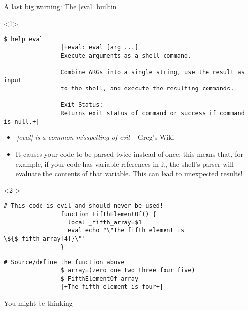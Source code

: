 \begin{frame}[fragile]{A last big warning: The \bash|eval| builtin}
    \begin{overlayarea}{\textwidth}{0.6\textheight}
        \begin{onlyenv}<1>
            \begin{lstlisting}[style=MyBash, numbers=none, xleftmargin=2mm, xrightmargin=2mm]
                $ help eval
                |+eval: eval [arg ...]
                Execute arguments as a shell command.

                Combine ARGs into a single string, use the result as input
                to the shell, and execute the resulting commands.

                Exit Status:
                Returns exit status of command or success if command is null.+|
            \end{lstlisting}
            \begin{itemize}
                \item \emph{\guillemotleft\textnormal{\,\bash|eval|} is a common misspelling of \alert{evil}\guillemotright} -- Greg's Wiki
                \item It causes your code to be parsed twice instead of once; this means that, for example, if your code has variable references in it, the shell's parser will evaluate the contents of that variable.
                      This can lead to unexpected results!
            \end{itemize}
        \end{onlyenv}
        \begin{onlyenv}<2->
            \begin{lstlisting}[style=MyBash, emph={[7]_fifth_array}]
                # This code is evil and should never be used!
                function FifthElementOf() {
                  local _fifth_array=$1
                  eval echo "\"The fifth element is \${$_fifth_array[4]}\""
                }
            \end{lstlisting}
            \smallskip
            \begin{lstlisting}[style=MyBash, emph={[7]_fifth_array}, belowskip=-5mm, firstnumber=6]
                # Source/define the function above
                $ array=(zero one two three four five)
                $ FifthElementOf array
                |+The fifth element is four+|
            \end{lstlisting}
            You might be thinking --  

\end{onlyenv}
\end{overlayarea}
\end{frame}
